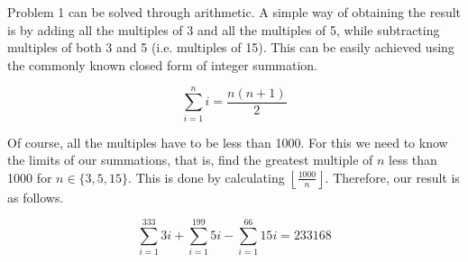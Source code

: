 \documentclass{article}
\begin{document}
Problem 1 can be solved through arithmetic. A simple way of obtaining the result is by adding all the multiples of 3 and all the multiples of 5, while subtracting multiples of both 3 and 5 (i.e. multiples of 15).
 This can be easily achieved using the commonly known closed form of integer summation.

	\[ \sum_{i=1}^n i = \frac{n(n+1)}{2} \]

Of course, all the multiples have to be less than 1000. For this we need to know the limits of our summations, that is, find the greatest multiple of $n$ less than 1000 for $n \in \{3, 5, 15\}$. This is done by calculating $\left\lfloor{\frac{1000}{n}}\right\rfloor$. Therefore, our result is as follows.

\[
	\sum_{i=1}^{333} 3i + \sum_{i=1}^{199} 5i - \sum_{i=1}^{66} 15i = 233168
\]
\end{document}
